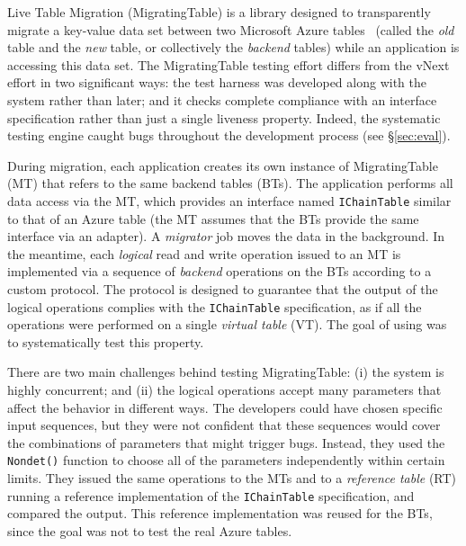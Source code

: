 Live Table Migration (MigratingTable) is a library designed to transparently migrate a key-value data set between two Microsoft Azure tables~\cite{azure-table} (called the \emph{old} table and the \emph{new} table, or collectively the \emph{backend} tables) while an application is accessing this data set. The MigratingTable testing effort differs from the vNext effort in two significant ways: the \psharp test harness was developed along with the system rather than later; and it checks complete compliance with an interface specification rather than just a single liveness property. Indeed, the \psharp systematic testing engine caught bugs throughout the development process (see \S\ref{sec:eval}).

During migration, each application creates its own instance of MigratingTable (MT) that refers to the same backend tables (BTs). The application performs all data access via the MT, which provides an interface named \texttt{IChainTable} similar to that of an Azure table (the MT assumes that the BTs provide the same interface via an adapter). A \emph{migrator} job moves the data in the background. In the meantime, each \emph{logical} read and write operation issued to an MT is implemented via a sequence of \emph{backend} operations on the BTs according to a custom protocol. The protocol is designed to guarantee that the output of the logical operations complies with the \texttt{IChainTable} specification, as if all the operations were performed on a single \emph{virtual table} (VT). The goal of using \psharp was to systematically test this property.

There are two main challenges behind testing MigratingTable: (i) the system is highly concurrent; and (ii) the logical operations accept many parameters that affect the behavior in different ways. The developers could have chosen specific input sequences, but they were not confident that these sequences would cover the combinations of parameters that might trigger bugs. Instead, they used the \psharp \texttt{Nondet()} function to choose all of the parameters independently within certain limits. They issued the same operations to the MTs and to a \emph{reference table} (RT) running a reference implementation of the \texttt{IChainTable} specification, and compared the output. This reference implementation was reused for the BTs, since the goal was not to test the real Azure tables.

